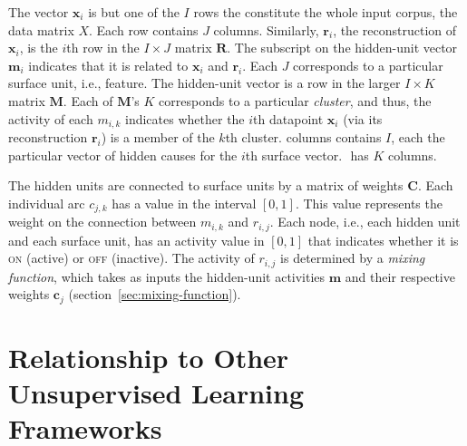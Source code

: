 The vector $\mathbf{x}_i$ is but one of the $I$ rows the constitute the whole 
input corpus, the data matrix $X$. Each row contains $J$ columns. Similarly, 
$\mathbf{r}_i$, the reconstruction of $\mathbf{x}_i$, is the $i$th row in the 
$I \times J$ matrix $\mathbf{R}$. The subscript on the hidden-unit vector 
$\mathbf{m}_i$ indicates that it is related to $\mathbf{x}_i$ and $\mathbf{r}_i$. 
Each $J$ corresponds to a particular surface unit, i.e., feature. 
The hidden-unit vector is a row in the larger $I \times K$ matrix 
$\mathbf{M}$. Each of $\mathbf{M}$'s $K$ corresponds to a particular 
\emph{cluster}, and thus, the activity of each $m_{i,k}$ indicates whether the $i$th 
datapoint $\mathbf{x}_i$ (via its reconstruction $\mathbf{r}_i$) is a member of the 
$k$th cluster.  columns contains $I$, each the particular vector of hidden causes for 
the $i$th surface vector. $\mathbf{}$ has $K$ columns.

%
%
%
The hidden units are connected to surface units by a matrix of weights $\mathbf{C}$. 
Each individual arc $c_{j,k}$ has a value in the interval $[0,1]$. This value 
represents the weight on the connection between $m_{i,k}$ and $r_{i,j}$.
Each node, i.e., each hidden unit and each surface unit, has an activity value in $[0,1]$ that
indicates whether it is \textsc{on} (active) or \textsc{off} (inactive).
The activity of $r_{i,j}$ is determined by a \emph{mixing function}, which takes as inputs the 
hidden-unit activities $\mathbf{m}$ and their respective weights $\mathbf{c}_j$
(section~\ref{sec:mixing-function}).



\section{Relationship to Other Unsupervised Learning Frameworks}
\label{sec:context}

